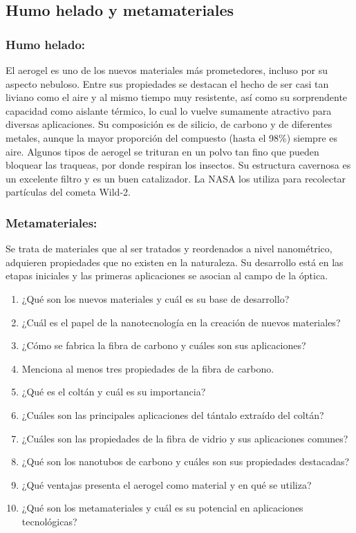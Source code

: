 \documentclass[../main]{subfiles}
\begin{document}
\subsection{Humo helado y metamateriales}

\subsubsection{Humo helado:}
El aerogel es uno de los nuevos materiales más prometedores, incluso
por su aspecto nebuloso. Entre sus propiedades se destacan el hecho
de ser casi tan liviano como el aire y al mismo tiempo muy
resistente, así como su sorprendente capacidad como aislante térmico,
lo cual lo vuelve sumamente atractivo para diversas aplicaciones. Su
composición es de silicio, de carbono y de diferentes metales, aunque
la mayor proporción del compuesto (hasta el 98\%) siempre es aire.
Algunos tipos de aerogel se trituran en un polvo tan fino que pueden
bloquear las traqueas, por donde respiran los insectos. Su estructura
cavernosa es un excelente filtro y es un buen catalizador. La NASA
los utiliza para recolectar partículas del cometa Wild-2.
\subsubsection{Metamateriales:}
Se trata de materiales que al ser tratados y reordenados a nivel
nanométrico, adquieren propiedades que no existen en la naturaleza.
Su desarrollo está en las etapas iniciales y las primeras
aplicaciones se asocian al campo de la óptica.

\begin{enumerate}
  \item ¿Qué son los nuevos materiales y cuál es su base de desarrollo?
  \item ¿Cuál es el papel de la nanotecnología en la creación de
    nuevos materiales?
  \item ¿Cómo se fabrica la fibra de carbono y cuáles son sus aplicaciones?
  \item Menciona al menos tres propiedades de la fibra de carbono.
  \item ¿Qué es el coltán y cuál es su importancia?
  \item ¿Cuáles son las principales aplicaciones del tántalo extraído
    del coltán?
  \item ¿Cuáles son las propiedades de la fibra de vidrio y sus
    aplicaciones comunes?
  \item ¿Qué son los nanotubos de carbono y cuáles son sus
    propiedades destacadas?
  \item ¿Qué ventajas presenta el aerogel como material y en qué se utiliza?
  \item ¿Qué son los metamateriales y cuál es su potencial en
    aplicaciones tecnológicas?
\end{enumerate}
\end{document}
